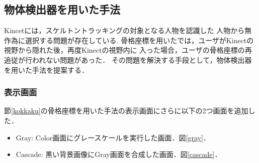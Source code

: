 \clearpage
\subsection{物体検出器を用いた手法}
Kincetには，スケルトントラッキングの対象となる人物を認識した
人物から無作為に選択する問題が存在している\cite{hitogomi}.
骨格座標を用いたでは，ユーザがKinectの視野から隠れた後，再度Kinectの視野内に
入った場合，ユーザの骨格座標の再追従が行われない問題があった．
その問題を解決する手段として，物体検出器を用いた手法を提案する．

\subsubsection{表示画面}
節\ref{kokkaku}の骨格座標を用いた手法の表示画面にさらに以下の2つ画面を追加した．

\begin{itemize}
    \item Gray: Color画面にグレースケールを実行した画面．図\ref{gray}．
    \item Cascade: 黒い背景画像にGray画面を合成した画面．図\ref{cascade}．
\end{itemize}

\vspace{1.5cm}

